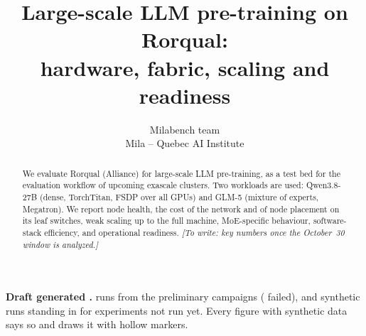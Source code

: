 \documentclass{article}
\title{Large-scale LLM pre-training on Rorqual:\\ hardware, fabric, scaling and readiness}
\author{%
  Milabench team \\
  Mila -- Quebec AI Institute \\
}
\newcommand{\placeholder}[1]{{\color{orange!80!black}\textit{[To write: #1]}}}
\begin{document}
\maketitle

\begin{abstract}
  We evaluate Rorqual (Alliance) for large-scale LLM pre-training, as a test bed for the evaluation
  workflow of upcoming exascale clusters. Two workloads are used: Qwen3.8-27B (dense, TorchTitan,
  FSDP over all GPUs) and GLM-5 (mixture of experts, Megatron). We report node health, the cost of the
  network and of node placement on its leaf switches, weak scaling up to the full machine, MoE-specific
  behaviour, software-stack efficiency, and operational readiness.
  \placeholder{key numbers once the October~30 window is analyzed.}
\end{abstract}

\begin{tcolorbox}[colback=red!4, colframe=red!50!black, boxrule=0.4pt, arc=0pt, fontupper=\small]
  \textbf{Draft generated \DataGenerated.} \NRunsReal{} runs from the preliminary campaigns
  (\NRunsFailed{} failed), and \NRunsSynthetic{} synthetic runs standing in for experiments not run yet.
  Every figure with synthetic data says so and draws it with hollow markers.
\end{tcolorbox}











\appendix


\end{document}
